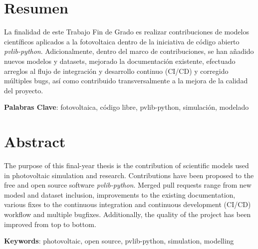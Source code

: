 \chapter*{Resumen} \label{chp:abstract}

La finalidad de este Trabajo Fin de Grado es realizar contribuciones de modelos científicos aplicados a la fotovoltaica dentro de la iniciativa de código abierto \textit{pvlib-python}. Adicionalmente, dentro del marco de contribuciones, se han añadido nuevos modelos y datasets, mejorado la documentación existente, efectuado arreglos al flujo de integración y desarrollo continuo (CI/CD) y corregido múltiples bugs, así como contribuido transversalmente a la mejora de la calidad del proyecto.

\textbf{Palabras Clave}: fotovoltaica, código libre, pvlib-python, simulación, modelado


\newpage


\chapter*{Abstract}

The purpose of this final-year thesis is the contribution of scientific models used in photovoltaic simulation and research. Contributions have been proposed to the free and open source software \textit{pvlib-python}. Merged pull requests range from new modesl and dataset inclusion, improvements to the existing documentation, various fixes to the continuous integration and continuous development (CI/CD) workflow and multiple bugfixes. Additionally, the quality of the project has been improved from top to bottom.

\textbf{Keywords}: photovoltaic, open source, pvlib-python, simulation, modelling
